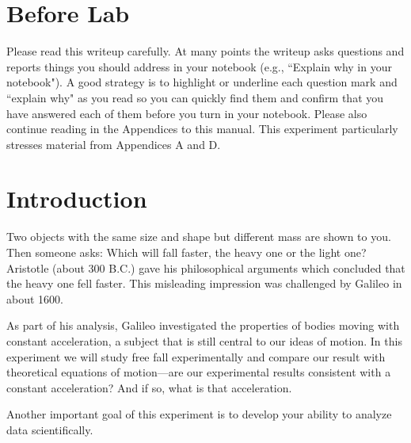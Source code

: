 \newexp

\section*{Before Lab}

Please read this writeup carefully. At many points the writeup asks
questions and reports things
you should address in your notebook (e.g., ``Explain why in your notebook").
A good strategy is to highlight or underline each question mark and ``explain why"
as you read so you can quickly
find them and confirm that you have answered each of them before you turn in your notebook.
Please also continue reading
in the Appendices to this manual.  This experiment particularly stresses
material from Appendices A and D.

\section*{Introduction}
     Two objects with the same size and shape but different mass are
     shown to you.  Then someone asks:
Which will fall faster, the heavy one or the light one?
Aristotle (about 300 B.C.)  gave his philosophical arguments
which concluded that the heavy one fell faster.  This misleading
 impression was challenged by
Galileo in about 1600.

As part of his analysis, Galileo investigated the properties of bodies
moving with constant acceleration, a subject that is still central to
our ideas of motion. In this experiment we will study free fall experimentally
and compare our result with theoretical equations of motion---are our
experimental results consistent with a constant acceleration?  And if so,
what is that acceleration.

  Another important goal of this experiment is to develop your
ability to analyze data scientifically.


